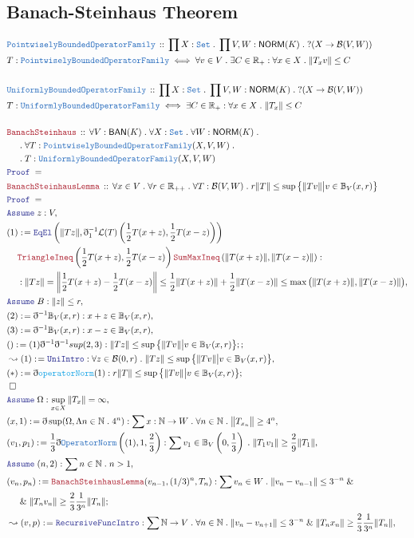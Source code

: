 \documentclass[12pt]{scrartcl}
\newcommand{\TYPE}[1]{\textcolor{NavyBlue}{\mathtt{#1}}}
\newcommand{\FUNC}[1]{\textcolor{Cerulean}{\mathtt{#1}}}
\newcommand{\LOGIC}[1]{\textcolor{Blue}{\mathtt{#1}}}
\newcommand{\THM}[1]{\textcolor{Maroon}{\mathtt{#1}}}
\renewcommand{\.}{\; . \;}
\newcommand{\de}{: \kern 0.1pc =}
\newcommand{\Theorem}[2]{& \THM{#1} \, :: \, #2 \\ & \Proof = \\ }
\newcommand{\DeclareType}[2]{& \TYPE{#1} \, :: \, #2 \\}
\newcommand{\DefineType}[3]{& #1 : \TYPE{#2} \iff #3 \\}
\newcommand{\NewLine}{\\ & \kern 1pc}
\newcommand{\Page}[1]{\begin{align*} #1 \end{align*} \newpage   }
\newcommand{ \bd }{ \ByDef }
\renewcommand{\And}{\; \& \;}
\newcommand{\Reals}{\mathbb{R} }
\newcommand{\Nat}{\mathbb{N} }
\newcommand{\Set}{\TYPE{Set}}
\newcommand{\Say}[3]{& #1 \de #2 : #3, \\}
\newcommand{\Conclude}[3]{& #1 \de #2 : #3; \\}
\newcommand{\Derive}[3]{& \leadsto #1 \de #2 : #3, \\}
\newcommand{\A}{\LOGIC{Assume} \;}
\newcommand{\Assume}[2]{& \A #1 : #2, \\}
\newcommand{\QED}{\; \square}
\newcommand{\EndProof}{& \QED \\}
\newcommand{\ByDef}{\eth}
\newcommand{\Proof}{\LOGIC{Proof} \; }
\renewcommand{\L}{\mathcal{L}}
\newcommand{\NORM}{\textsf{NORM}}
\newcommand{\BAN}{\textsf{BAN}}
\renewcommand{\O}{\Omega}
\newcommand{\B}{\mathcal{B}}
\begin{document}
\subsection{Banach-Steinhaus Theorem}
\Page{
\DeclareType{PointwiselyBoundedOperatorFamily}{\prod X : \Set \. \prod V,W : \NORM(K) \. ?(X \to \B(V,W))}
\DefineType{T}{PointwiselyBoundedOperatorFamily}{
\forall v \in V  \. \exists C \in \Reals_{+} : \forall x \in X \. \| T_x v \| \le C  }
\\
\DeclareType{UniformlyBoundedOperatorFamily}{\prod X : \Set \. \prod V,W : \NORM(K) \. ?(X \to \B(V,W))}
\DefineType{T}{UniformlyBoundedOperatorFamily}{
\exists C \in \Reals_{+} :  \forall x \in X \.  \| T_x  \| \le C  
}
\\
\Theorem{BanachSteinhaus}{\forall V : \BAN(K) \. \forall X : \Set \. \forall W : \NORM(K) 
\. \NewLine
\. \forall   T : \TYPE{PointwiselyBoundedOperatorFamily}(X,V,W) \.
\NewLine \.
T : \TYPE{UniformlyBoundedOperatorFamily}(X,V,W)
}
\Theorem{BanachSteinhausLemma}{\forall x \in V \. \forall r \in \Reals_{++} \. \forall T : \B(V,W)
\. r\| T \| \le \sup \big\{  \| T v \| \big|  v \in \mathbb{B}_V(x,r)   \big\}
}
\Assume{z}{V}
\Say{(1)}{\LOGIC{EqEl}\left(\|Tz\|,\bd^{-1}_1 \L(T)\left( 
\frac{1}{2} T(x + z), \frac{1}{2}T(x - z)
\right)\right) \NewLine \THM{TriangleIneq}\left(
\frac{1}{2} T(x + z), \frac{1}{2}T(x - z)
\right)
\THM{SumMaxIneq}\left( \| T(x + z)  \|, \| T(x - z ) \| \right)
}{ \NewLine : \| Tz \| = \left\| \frac{1}{2} T(x + z) - \frac{1}{2}T(x - z)\right\| \le
\frac{1}{2}\| T(x + z)  \| + \frac{1}{2}\| T(x - z) \| \le \max\big( 
 \| T(x + z)  \|, \| T(x - z ) \| 
\big)
  }
\Assume{B}{\| z \| \le r}
\Say{(2)}{\bd^{-1} \mathbb{B}_V(x,r)}{ x + z \in \mathbb{B}_V(x,r)}
\Say{(3)}{\bd^{-1} \mathbb{B}_V(x,r)}{x - z  \in \mathbb{B}_V(x,r) }
\Conclude{()}{(1)\bd^{-1} \bd^{-1}{sup}(2,3)}{ \| Tz \| \le \sup \big\{  \| Tv \|  \big|  v \in \mathbb{B}_V(x,r)   \big\} ; }
\Derive{(1)}{\LOGIC{UniIntro}}{ \forall z \in \B(0,r) \. \| Tz \| \le \sup \big\{  \| Tv \|  \big|  v \in \mathbb{B}_V(x,r)   \big\} }
\Conclude{(*)}{ \bd \FUNC{operatorNorm}(1)}{  r\| T \| \le \sup \big\{  \| T v \| \big|  v \in \mathbb{B}_V(x,r) \big \} }
\EndProof
\Assume{\O}{\sup_{x \in X} \| T_x \| = \infty}
\Say{(x,1)}{\bd \sup (\O, \Lambda n \in \Nat \. 4^n )}{
 \sum x : \Nat \to W \.   \forall n \in \Nat \. \big\| T_{x_n} \big\| \ge  4^n
}
\Say{(v_1,p_1)}{ \frac{1}{3}\bd \TYPE{OperatorNorm}\left((1),1, \frac{2}{3} \right)}
{ \sum v_1 \in \mathbb{B}_V\left(0, \frac{1}{3} \right) \. 
 \| T_1 v_1 \| \ge  \frac{2}{9} \| T_1 \|
  }
\Assume{(n,2)}{ \sum n \in \Nat \. n > 1}
\Conclude{(v_n,p_n)}{ \THM{BanachSteinhausLemma}(v_{n - 1}, (1/3)^n,T_n)}
{\sum  v_n \in W  \. \| v_{n} - v_{n - 1} \| \le 3^{-n}
 \And  
 \NewLine \And  
  \| T_n v_n \| \ge  \frac{2}{3} \frac{1}{3^n} \| T_n \| 
}
\Derive{(v,p)}{\LOGIC{RecursiveFuncIntro}}{\sum \Nat \to V \. 
 \forall n \in \Nat \. \| v_n - v_{n + 1} \| \le 3^{-n} \And \| T_n x_n \| \ge \frac{2}{3}
 \frac{1}{3^n} \| T_n \|
}
}
\end{document}

